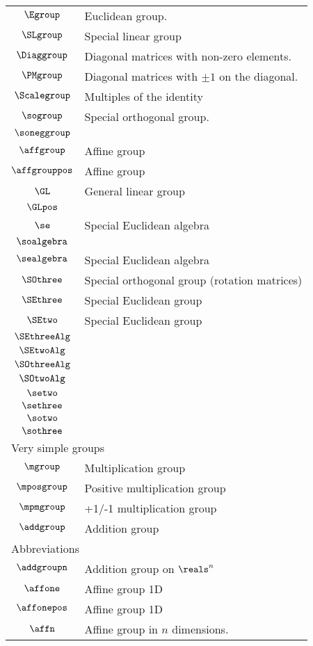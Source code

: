 \begin{longtable}{cl}
 $\Egroup$ &   Euclidean group.\\ 
 $\SLgroup$ &   Special linear group\\ 
 $\Diaggroup$ &   Diagonal matrices with non-zero elements.\\ 
 $\PMgroup$ &   Diagonal matrices with $\pm 1$ on the diagonal.\\ 
 $\Scalegroup$ &   Multiples of the identity\\ 
 $\sogroup$ &  Special orthogonal group.\\ 
 $\soneggroup$ & \\ 
 $\affgroup$ &  Affine group \\ 
 $\affgrouppos$ &  Affine group \\ 
 $\GL$ &  General linear group\\ 
 $\GLpos$ &  \\ 
 $\se$ &  Special Euclidean algebra\\ 
 $\soalgebra$ & \\ 
 $\sealgebra$ &  Special Euclidean algebra\\ 
 $\SOthree$ &  Special orthogonal group (rotation matrices)\\ 
 $\SEthree$ &  Special Euclidean group \\ 
 $\SEtwo$ &  Special Euclidean group \\ 
 $\SEthreeAlg$ & \\ 
 $\SEtwoAlg$ & \\ 
 $\SOthreeAlg$ & \\ 
 $\SOtwoAlg$ & \\ 
 $\setwo$ & \\ 
 $\sethree$ & \\ 
 $\sotwo$ & \\ 
 $\sothree$ & \\ 
 \multicolumn{2}{l}{Very simple groups}\\ 
 \hline
$\mgroup$ &  Multiplication group\\ 
 $\mposgroup$ &  Positive multiplication group\\ 
 $\mpmgroup$ &  +1/-1 multiplication group\\ 
 $\addgroup$ &  Addition group\\ 
 \multicolumn{2}{l}{Abbreviations}\\ 
 \hline
$\addgroupn$ &  Addition group on $\reals^n$\\ 
 $\affone$ &  Affine group 1D\\ 
 $\affonepos$ &  Affine group 1D\\ 
 $\affn$ &  Affine group in $n$ dimensions.\\ 

\end{longtable}
